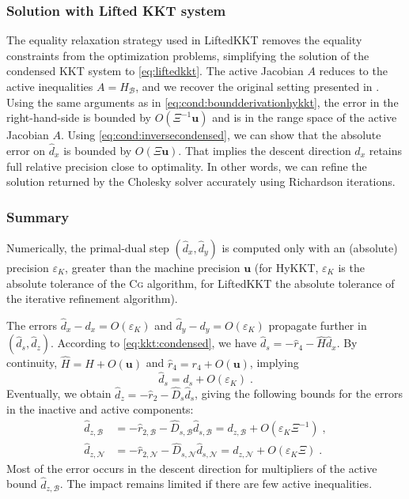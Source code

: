 \documentclass[smallextended]{svjour3}
\newcommand{\CG}{\textsc{Cg}\xspace}
\newcommand{\epstol}{\mathbf{u}}
\newcommand{\cactive}{\mathcal{B}}
\newcommand{\cinactive}{\mathcal{N}}
\begin{document}
\subsubsection{Solution with Lifted KKT system}
The equality relaxation strategy used in LiftedKKT
removes the equality constraints from the optimization problems, simplifying
the solution of the condensed KKT system to \eqref{eq:liftedkkt}.
The active Jacobian $A$ reduces to the active inequalities $A = H_{\cactive}$,
and we recover the original setting presented in \cite{wright1998ill}.
Using the same arguments as in \eqref{eq:cond:boundderivationhykkt},
the error in the right-hand-side is bounded by $O(\Xi^{-1} \epstol)$ and is in the
range space of the active Jacobian $A$. Using \eqref{eq:cond:inversecondensed},
we can show that the absolute error on $\widehat{d}_x$ is bounded by
$O(\Xi \epstol)$. That implies the descent direction $\widehat{d}_x$ retains
full relative precision close to optimality.
In other words, we can refine the solution returned by the Cholesky solver accurately using
Richardson iterations.

\subsubsection{Summary}
Numerically, the primal-dual step $(\widehat{d}_x, \widehat{d}_y)$
is computed only with an (absolute) precision $\varepsilon_{K}$,
greater than the machine precision $\epstol$ (for HyKKT, $\varepsilon_K$
is the absolute tolerance of the \CG algorithm, for LiftedKKT the
absolute tolerance of the iterative refinement algorithm).

The errors $\widehat{d}_x - d_x = O(\varepsilon_K)$ and
$\widehat{d}_y - d_y = O(\varepsilon_K)$ propagate further in $(\widehat{d}_s, \widehat{d}_z)$.
According to \eqref{eq:kkt:condensed}, we have $\widehat{d}_s = - \widehat{r}_4 - \widehat{H} \widehat{d}_x$.
By continuity, $\widehat{H} = H + O(\epstol)$ and $\widehat{r}_4 = r_4 + O(\epstol)$, implying
\begin{equation}
  \widehat{d}_s = d_s + O(\varepsilon_K) \; .
\end{equation}
Eventually, we obtain $\widehat{d}_z = - \widehat{r}_2 - \widehat{D}_s \widehat{d}_s$,
giving the following bounds for the errors in the inactive and active components:
\begin{equation}
  \begin{aligned}
     \widehat{d}_{z,\cactive} &= -\widehat{r}_{2,\cactive} - \widehat{D}_{s,\cactive} \widehat{d}_{s,\cactive}
    = d_{z,\cactive} + O(\varepsilon_K \Xi^{-1}) \;,\\
                              \widehat{d}_{z,\cinactive} &= -\widehat{r}_{2,\cinactive} - \widehat{D}_{s,\cinactive} \widehat{d}_{s,\cinactive}
                               = d_{z,\cinactive} + O(\varepsilon_K \Xi) \; .
  \end{aligned}
\end{equation}
Most of the error occurs in the descent direction for multipliers of the active bound $\widehat{d}_{z,\cactive}$.
The impact remains limited if there are few active inequalities.
\end{document}
